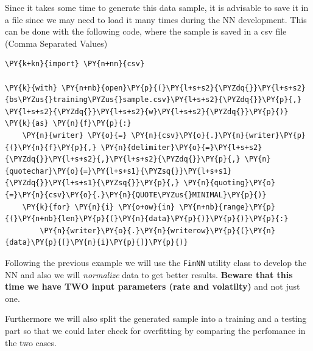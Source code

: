     Since it takes some time to generate this data sample, it is advisable
to save it in a file since we may need to load it many times during the
NN development. This can be done with the following code, where the
sample is saved in a csv file (Comma Separated Values)

    \begin{tcolorbox}[breakable, size=fbox, boxrule=1pt, pad at break*=1mm,colback=cellbackground, colframe=cellborder]
\begin{Verbatim}[commandchars=\\\{\}]
\PY{k+kn}{import} \PY{n+nn}{csv}

\PY{k}{with} \PY{n+nb}{open}\PY{p}{(}\PY{l+s+s2}{\PYZdq{}}\PY{l+s+s2}{bs\PYZus{}training\PYZus{}sample.csv}\PY{l+s+s2}{\PYZdq{}}\PY{p}{,} \PY{l+s+s2}{\PYZdq{}}\PY{l+s+s2}{w}\PY{l+s+s2}{\PYZdq{}}\PY{p}{)} \PY{k}{as} \PY{n}{f}\PY{p}{:}
    \PY{n}{writer} \PY{o}{=} \PY{n}{csv}\PY{o}{.}\PY{n}{writer}\PY{p}{(}\PY{n}{f}\PY{p}{,} \PY{n}{delimiter}\PY{o}{=}\PY{l+s+s2}{\PYZdq{}}\PY{l+s+s2}{,}\PY{l+s+s2}{\PYZdq{}}\PY{p}{,} \PY{n}{quotechar}\PY{o}{=}\PY{l+s+s1}{\PYZsq{}}\PY{l+s+s1}{\PYZdq{}}\PY{l+s+s1}{\PYZsq{}}\PY{p}{,} \PY{n}{quoting}\PY{o}{=}\PY{n}{csv}\PY{o}{.}\PY{n}{QUOTE\PYZus{}MINIMAL}\PY{p}{)}
    \PY{k}{for} \PY{n}{i} \PY{o+ow}{in} \PY{n+nb}{range}\PY{p}{(}\PY{n+nb}{len}\PY{p}{(}\PY{n}{data}\PY{p}{)}\PY{p}{)}\PY{p}{:}
        \PY{n}{writer}\PY{o}{.}\PY{n}{writerow}\PY{p}{(}\PY{n}{data}\PY{p}{[}\PY{n}{i}\PY{p}{]}\PY{p}{)}
\end{Verbatim}
\end{tcolorbox}

    Following the previous example we will use the \texttt{FinNN} utility
class to develop the NN and also we will \emph{normalize} data to get
better results. \textbf{Beware that this time we have TWO input
parameters (rate and volatilty)} and not just one.

Furthermore we will also split the generated sample into a training and
a testing part so that we could later check for overfitting by comparing
the perfomance in the two cases.

